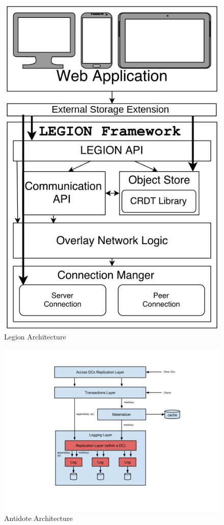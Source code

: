 \begin{figure}[H]
\centering
\includegraphics[scale=0.4]{files/legionArchitecture.png}
\caption{Legion Architecture}
\label{legion_architecture}
\end{figure}

\begin{figure}[H]
\centering
\includegraphics[scale=0.5]{files/antidoteArchitecture.png}
\caption{Antidote Architecture}
\label{antidote_architecture}
\end{figure}

